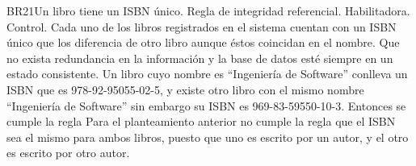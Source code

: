 \begin{BussinesRule}{BR21}{Un libro tiene un ISBN único.}
    \BRitem[Tipo:] Regla de integridad referencial.
    \BRitem[Clase:] Habilitadora.
    \BRitem[Nivel:] Control.
    \BRitem[Descripción:] Cada uno de los libros registrados en el sistema cuentan con un ISBN único que los diferencia de otro libro aunque éstos coincidan en el nombre.
    \BRitem[Motivación:] Que no exista redundancia en la información y la base de datos esté siempre en un estado consistente.
     Un libro cuyo nombre es ``Ingeniería de Software'' conlleva un ISBN que es 978-92-95055-02-5, y existe otro libro con el mismo nombre ``Ingeniería de Software'' sin embargo su ISBN es 969-83-59550-10-3. Entonces se cumple la regla
     Para el planteamiento anterior no cumple la regla que el ISBN sea el mismo para ambos libros, puesto que uno es escrito por un autor, y el otro es escrito por otro autor.
\end{BussinesRule}
